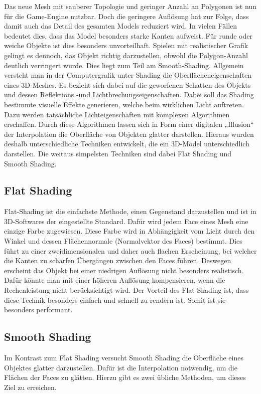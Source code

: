 Das neue Mesh mit sauberer Topologie und geringer Anzahl an Polygonen ist nun für die Game-Engine nutzbar. Doch die geringere Auflösung hat zur Folge, dass damit auch das Detail des gesamten Models reduziert wird. In vielen Fällen bedeutet dies, dass das Model besonders starke Kanten aufweist. Für runde oder weiche Objekte ist dies besonders unvorteilhaft. Spielen mit realistischer Grafik gelingt es dennoch, das Objekt richtig darzustellen, obwohl die Polygon-Anzahl deutlich verringert wurde. Dies liegt zum Teil am Smooth-Shading.
Allgemein versteht man in der Computergrafik unter Shading die Oberflächeneigenschaften eines 3D-Meshes. Es bezieht sich dabei auf die geworfenen Schatten des Objekts und dessen Reflektions -und Lichtbrechungseigenschaften. Dabei soll das Shading bestimmte visuelle Effekte generieren, welche beim wirklichen Licht auftreten. Dazu werden tatsächliche Lichteigenschaften mit komplexen Algorithmen erschaffen. Durch diese Algorithmen lassen sich in Form einer digitalen „Illusion“ der Interpolation die Oberfläche von Objekten glatter darstellen.
Hieraus wurden deshalb unterschiedliche Techniken entwickelt, die ein 3D-Model unterschiedlich darstellen. Die weitaus simpelsten Techniken sind dabei Flat Shading und Smooth Shading.

\subsection{Flat Shading}

Flat-Shading ist die einfachste Methode, einen Gegenstand darzustellen und ist in 3D-Softwares der eingestellte Standard. Dafür wird jedem Face eines Mesh eine einzige Farbe zugewiesen. Diese Farbe wird in Abhängigkeit vom Licht durch den Winkel und dessen Flächennormale (Normalvektor des Faces) bestimmt. Dies führt zu einer zweidimensionalen und daher auch flachen Erscheinung, bei welcher die Kanten zu scharfen Übergängen zwischen den Faces führen. Deswegen erscheint das Objekt bei einer niedrigen Auflösung nicht besonders realistisch. Dafür könnte man mit einer höheren Auflösung kompensieren, wenn die Rechenleistung nicht berücksichtigt wird. Der Vorteil des Flat Shading ist, dass diese Technik besonders einfach und schnell zu rendern ist. Somit ist sie besonders performant.

\subsection{Smooth Shading}

Im Kontrast zum Flat Shading versucht Smooth Shading die Oberfläche eines Objektes glatter darzustellen. Dafür ist die Interpolation notwendig, um die Flächen der Faces zu glätten. Hierzu gibt es zwei übliche Methoden, um dieses Ziel zu erreichen.

